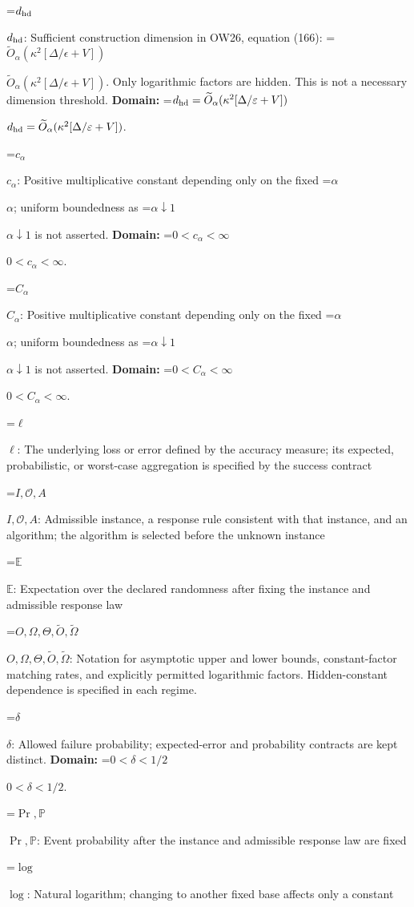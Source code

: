 \documentclass[10pt,a4paper]{article}
\newcommand{\AtlasMath}[1]{\par\begingroup\centering\setbox0=\hbox{$\displaystyle #1$}\ifdim\wd0>1.4\linewidth\typeout{ATLAS WIDE FORMULA: \the\wd0}\fi\ifdim\wd0>\linewidth\resizebox{\linewidth}{!}{\box0}\else\box0\fi\par\endgroup}
\newcommand{\AtlasInlineMath}[1]{\begingroup\setbox0=\hbox{$#1$}\ifdim\wd0>.4\linewidth\endgroup\AtlasMath{#1}\else\endgroup$#1$\fi}
\begin{document}
\AtlasInlineMath{d_{\rm hd}}: Sufficient construction dimension in OW26, equation (166): \AtlasInlineMath{\widetilde O_\alpha(\kappa^2[\Delta/\epsilon+V])}. Only logarithmic factors are hidden. This is not a necessary dimension threshold. \textbf{Domain:} \AtlasInlineMath{d_{\rm hd}=\widetilde{O}_\alpha(\kappa^2[\Delta/\varepsilon+V])}.



\AtlasInlineMath{c_\alpha}: Positive multiplicative constant depending only on the fixed \AtlasInlineMath{\alpha}; uniform boundedness as \AtlasInlineMath{\alpha\downarrow1} is not asserted. \textbf{Domain:} \AtlasInlineMath{0<c_\alpha<\infty}.



\AtlasInlineMath{C_\alpha}: Positive multiplicative constant depending only on the fixed \AtlasInlineMath{\alpha}; uniform boundedness as \AtlasInlineMath{\alpha\downarrow1} is not asserted. \textbf{Domain:} \AtlasInlineMath{0<C_\alpha<\infty}.



\AtlasInlineMath{\ell}: The underlying loss or error defined by the accuracy measure; its expected, probabilistic, or worst-case aggregation is specified by the success contract



\AtlasInlineMath{I,\mathcal{O},A}: Admissible instance, a response rule consistent with that instance, and an algorithm; the algorithm is selected before the unknown instance



\AtlasInlineMath{\mathbb{E}}: Expectation over the declared randomness after fixing the instance and admissible response law



\AtlasInlineMath{O,\Omega,\Theta,\widetilde{O},\widetilde\Omega}: Notation for asymptotic upper and lower bounds, constant-factor matching rates, and explicitly permitted logarithmic factors. Hidden-constant dependence is specified in each regime.



\AtlasInlineMath{\delta}: Allowed failure probability; expected-error and probability contracts are kept distinct. \textbf{Domain:} \AtlasInlineMath{0<\delta<1/2}.



\AtlasInlineMath{\Pr,\mathbb{P}}: Event probability after the instance and admissible response law are fixed



\AtlasInlineMath{\log}: Natural logarithm; changing to another fixed base affects only a constant
\end{document}
